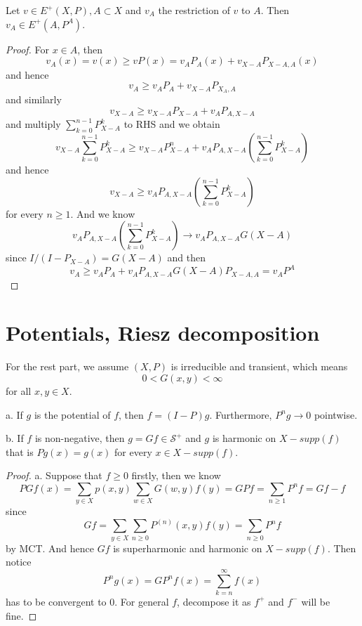 \documentclass[lang=en,11pt,a4paper,citestyle =authoryear]{elegantpaper}
\newcommand{\Sar}{\mathcal{S}}
\begin{document}
\begin{theorem}
    Let $v\in E^+(X,P), A\subset X$ and $v_A$ the restriction of $v$ to $A$. Then $v_A \in E^+(A,P^A)$.
\end{theorem}
\begin{proof}
    For $x\in A$, then
    \[v_A(x) = v(x )\geq vP(x) = v_AP_A(x) + v_{X-A}P_{X-A, A}(x)\]
    and hence
    \[
    v_A \geq v_AP_A + v_{X-A}P_{X_A,A}
    \]
    and similarly
    \[
    v_{X-A} \geq v_{X-A}P_{X-A} + v_AP_{A,X-A}
    \]
    and multiply $\sum\limits_{k=0}^{n-1}P_{X-A}^k$ to RHS and we obtain
    \[
    v_{X-A}\sum\limits_{k=0}^{n-1}P_{X-A}^k \geq v_{X-A}P_{X-A}^n + v_AP_{A,X-A}(\sum\limits_{k=0}^{n-1}P_{X-A}^k)
    \]
    and hence
    \[
    v_{X-A} \geq v_AP_{A,X-A}(\sum\limits_{k=0}^{n-1}P_{X-A}^k)
    \]
    for every $n\geq 1$. And we know
    \[v_AP_{A,X-A}(\sum\limits_{k=0}^{n-1}P_{X-A}^k) \to v_AP_{A,X-A} G(X-A)\]
    since $I/(I-P_{X-A}) = G(X-A)$ and then
    \[
    v_A \geq v_AP_A + v_AP_{A,X-A}G(X-A)P_{X-A,A} = v_AP^A
    \]
\end{proof}

\section{Potentials, Riesz decomposition}

For the rest part, we assume $(X,P)$ is irreducible and transient, which means
    \[0 < G(x,y) < \infty\]
for all $x,y \in X$.\par

\begin{lemma}
    a. If $g$ is the potential of $f$, then $f = (I-P)g$. Furthermore, $P^ng\to 0$ pointwise.\par
    b. If $f$ is non-negative, then $g = Gf \in \Sar^+$ and $g$ is harmonic on $X- supp(f)$ that is $Pg(x) = g(x)$ for every $x\in X-supp(f)$.
\end{lemma}
\begin{proof}
    a. Suppose that $f \geq 0$ firstly, then we know
    \[
    P Gf(x) = \sum\limits_{y\in X}p(x,y)\sum\limits_{w\in X} G(w,y)f(y) = G Pf = \sum\limits_{n\geq 1}P^n f = Gf - f
    \]
    since
    \[
    Gf = \sum\limits_{y\in X}\sum_{n\geq 0}P^{(n)}(x,y)f(y) = \sum\limits_{n\geq 0}P^nf
    \]
    by MCT. And hence $Gf$ is superharmonic and harmonic on $X-supp(f)$. Then notice
    \[
    P^ng(x) = GP^nf(x) = \sum\limits_{k=n}^{\infty}f(x)
    \]
    has to be convergent to $0$. For general $f$, decompose it as $f^+$ and $f^-$ will be fine.
\end{proof}
\end{document}

